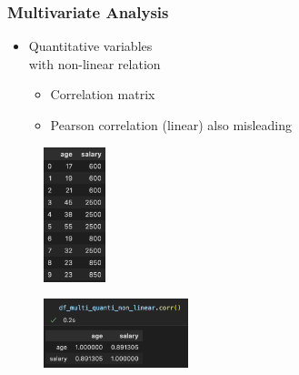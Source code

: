 \begin{frame}\frametitle{Multivariate Analysis}
   \begin{minipage}{0.48\linewidth}
      \begin{itemize}
         \item Quantitative variables\\
               with non-linear relation
         \begin{itemize}
            \item Correlation matrix
            \item Pearson correlation (linear) also misleading
         \end{itemize}
      \end{itemize}
      \vspace{.5cm}
      \begin{figure}[H]
         \includegraphics[width=1.8cm]{../images/illustrations/pattern_multivariate_quantitative_non_linear_df.png}
      \end{figure}
   \end{minipage}
   \begin{minipage}{0.48\linewidth}
      \begin{figure}[H]
         \includegraphics[width=4.2cm]{../images/illustrations/pattern_multivariate_quantitative_non_linear_corr_pearson.png}
      \end{figure}
   \end{minipage}
\end{frame}

